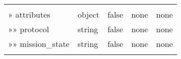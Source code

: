 \documentclass[
]{article}
\begin{document}
\begin{longtable}[]{@{}lllll@{}}
\begin{minipage}[t]{0.17\columnwidth}
\end{minipage}\tabularnewline
\begin{minipage}[t]{0.17\columnwidth}\raggedright
» attributes\strut
\end{minipage} & \begin{minipage}[t]{0.17\columnwidth}\raggedright
object\strut
\end{minipage} & \begin{minipage}[t]{0.17\columnwidth}\raggedright
false\strut
\end{minipage} & \begin{minipage}[t]{0.17\columnwidth}\raggedright
none\strut
\end{minipage} & \begin{minipage}[t]{0.17\columnwidth}\raggedright
none\strut
\end{minipage}\tabularnewline
\begin{minipage}[t]{0.17\columnwidth}\raggedright
»» protocol\strut
\end{minipage} & \begin{minipage}[t]{0.17\columnwidth}\raggedright
string\strut
\end{minipage} & \begin{minipage}[t]{0.17\columnwidth}\raggedright
false\strut
\end{minipage} & \begin{minipage}[t]{0.17\columnwidth}\raggedright
none\strut
\end{minipage} & \begin{minipage}[t]{0.17\columnwidth}\raggedright
none\strut
\end{minipage}\tabularnewline
\begin{minipage}[t]{0.17\columnwidth}\raggedright
»» mission\_state\strut
\end{minipage} & \begin{minipage}[t]{0.17\columnwidth}\raggedright
string\strut
\end{minipage} & \begin{minipage}[t]{0.17\columnwidth}\raggedright
false\strut
\end{minipage} & \begin{minipage}[t]{0.17\columnwidth}\raggedright
none\strut
\end{minipage} & \begin{minipage}[t]{0.17\columnwidth}\raggedright
none\strut
\end{minipage}\tabularnewline
\begin{minipage}[t]{0.17\columnwidth}\raggedright

\end{minipage}
\end{longtable}
\end{document}
